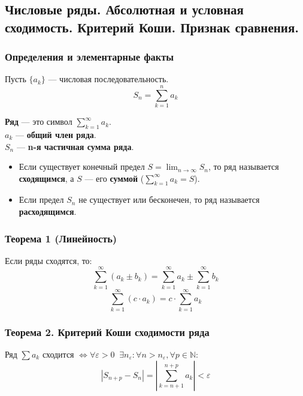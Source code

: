 \subsection{Числовые ряды. Абсолютная и условная сходимость. Критерий Коши. Признак сравнения.}

\subsubsection*{Определения и элементарные факты}
Пусть $\{a_k\}$ — числовая последовательность.
\[ S_n = \sum^n_{k=1}a_k \]
\begin{tcolorbox}[title=Определения]
    \textbf{Ряд} — это символ $\sum^\infty_{k=1} a_k$. \\
    $a_k$ — \textbf{общий член ряда}.\\
    $S_n$ — \textbf{n-я частичная сумма ряда}.\\
    
    \begin{itemize}
        \item Если существует конечный предел $S = \lim_{n\to\infty} S_n$, то ряд называется \textbf{сходящимся}, а $S$ — его \textbf{суммой} ($\sum_{k=1}^\infty a_k = S$).
        \item Если предел $S_n$ не существует или бесконечен, то ряд называется \textbf{расходящимся}.
    \end{itemize}
\end{tcolorbox}

\subsubsection*{Теорема 1 (Линейность)}
Если ряды сходятся, то:
\[ \sum_{k=1}^\infty (a_k \pm b_k) = \sum_{k=1}^\infty a_k \pm \sum_{k=1}^\infty b_k \]
\[ \sum_{k=1}^\infty (c \cdot a_k) = c \cdot \sum_{k=1}^\infty a_k \]

\subsubsection*{Теорема 2. Критерий Коши сходимости ряда}
Ряд $\sum a_k$ сходится $\Leftrightarrow \forall \varepsilon > 0\;\; \exists n_\varepsilon : \forall n > n_\varepsilon, \forall p \in \mathbb{N}$:
\[ |S_{n+p} - S_n| = \left| \sum_{k=n+1}^{n+p} a_k \right| < \varepsilon \]

